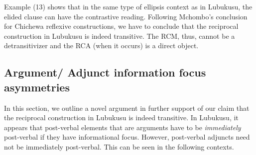 \documentclass[output=paper]{langsci/langscibook}
\begin{document}
\ea\label{ex:}
\\
\ea\label{ex:}
\\
\ea\label{ex:}
  \\
\ea\label{ex:}
\\
\ea\label{ex:}
\\


Example (13) shows that in the same type of ellipsis context as in Lubukusu, the elided clause can have the contrastive reading. Following Mchombo's conclusion for Chichewa reflexive constructions, we have to conclude that the reciprocal construction in Lubukusu is indeed transitive. The RCM, thus, cannot be a detransitivizer and the RCA (when it occurs) is a direct object.

\subsection{Argument/ Adjunct information focus asymmetries}

  In this section, we outline a novel argument in further support of our claim that the reciprocal construction in Lubukusu is indeed transitive. In Lubukusu, it appears that post-verbal elements that are arguments have to be \textit{immediately} post-verbal if they have informational focus. However, post-verbal adjuncts need not be immediately post-verbal. This can be seen in the following contexts.



\ea\label{ex:}
  \\
\ea\label{ex:}
\\
\ea\label{ex:}
\\
\ea\label{ex:}
\\


\ea\label{ex:}
\\
\end{document}
